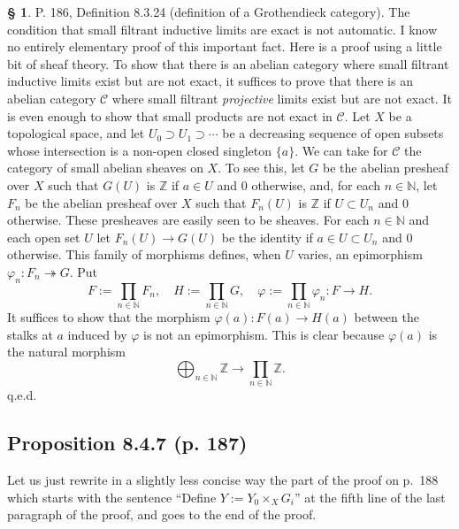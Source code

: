 \documentclass[12pt]{article}
\theoremstyle{remark}
\theoremstyle{definition}
\newtheorem{s}[thm]{\S}
\newcommand{\nn}{\noindent}
\newcommand{\C}{\mathcal C}
\newcommand{\epi}{\twoheadrightarrow}
\begin{document}
\nn[\S\ref{adic} p.~\pageref{adic} will be inserted here.]
%
\begin{s} 
P. 186, Definition 8.3.24 (definition of a Grothendieck category). The condition that small filtrant inductive limits are exact is not automatic. I know no entirely elementary proof of this important fact. Here is a proof using a little bit of sheaf theory. To show that there is an abelian category where small filtrant inductive limits exist but are not exact, it suffices to prove that there is an abelian category $\C$ where small filtrant {\em projective} limits exist but are not exact. It is even enough to show that small products are not exact in $\C$. Let $X$ be a topological space, and let $U_0\supset U_1\supset\cdots$ be a decreasing sequence of open subsets whose intersection is a non-open closed singleton $\{a\}$. We can take for $\C$ the category of small abelian sheaves on $X$. To see this, let $G$ be the abelian presheaf over $X$ such that $G(U)$ is $\mathbb Z$ if $a\in U$ and 0 otherwise, and, for each $n\in\mathbb N$, let $F_n$ be the abelian presheaf over $X$ such that $F_n(U)$ is $\mathbb Z$ if $U\subset U_n$ and 0 otherwise. These presheaves are easily seen to be sheaves. For each $n\in\mathbb N$ and each open set $U$ let $F_n(U)\to G(U)$ be the identity if $a\in U\subset U_n$ and 0 otherwise. This family of morphisms defines, when $U$ varies, an epimorphism $\varphi_n:F_n\epi G$. Put 
$$
F:=\prod_{n\in\mathbb N}F_n,\quad H:=\prod_{n\in\mathbb N}G,\quad\varphi:=\prod_{n\in\mathbb N}\varphi_n:F\to H.
$$ 
It suffices to show that the morphism $\varphi(a):F(a)\to H(a)$ between the stalks at $a$ induced by $\varphi$ is not an epimorphism. This is clear because $\varphi(a)$ is the natural morphism 
$$
\bigoplus_{n\in\mathbb N}\mathbb Z\to\prod_{n\in\mathbb N}\mathbb Z.
$$
q.e.d.
\end{s}
%
%
\subsection{Proposition 8.4.7 (p. 187)}
%
Let us just rewrite in a slightly less concise way the part of the proof on p.~188 which starts with the sentence ``Define $Y:=Y_0\times_XG_i$'' at the fifth line of the last paragraph of the proof, and goes to the end of the proof. 
\end{document}
